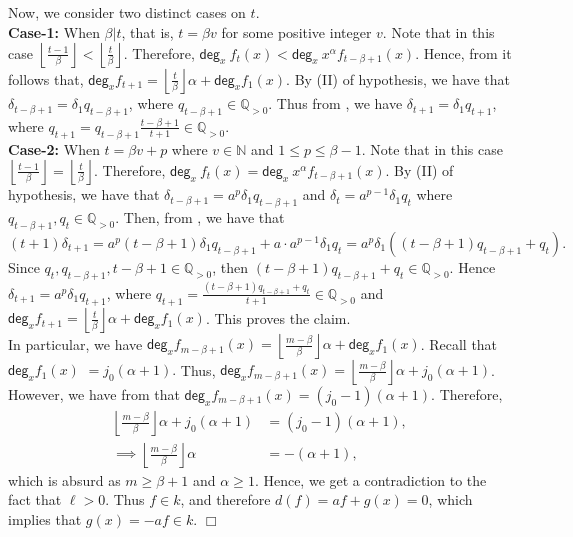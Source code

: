 \documentclass[12pt,reqno]{amsart}
\renewcommand{\deg}{\mathsf{deg}}
\renewcommand{\geq}{\geqslant}
\numberwithin{thm}{section}
\theoremstyle{definition}
\numberwithin{equation}{thm}
\renewenvironment{proof}{\par\noindent {\em Proof:}}{\hfill$\Box$\medskip}
\theoremstyle{plain}
\begin{document}
\begin{proof}
    Now, we consider two distinct cases on $t$.\\
    \noindent \textbf{Case-1:} When $\beta 
    |t$, that is, $t=\beta v$ for some positive integer $v$. Note that in this case $\left\lfloor \frac{t-1}{\beta}\right\rfloor<\left\lfloor \frac{t}{\beta}\right\rfloor$. Therefore, $\deg_x \ f_t(x)< \deg_x \ x^\alpha f_{t-\beta+1}(x)$. Hence, from  it follows that, $\deg_x f_{t+1}=\left\lfloor \frac{t}{\beta}\right\rfloor\alpha +\deg_xf_1(x)$. By (II) of hypothesis, we have that $\delta_{t-\beta+1}=\delta_1 q_{t-\beta+1}$, where $q_{t-\beta+1}\in \mathbb{Q}_{>0}$. Thus from , we have $\delta_{t+1}=\delta_1 q_{t+1}$, where $q_{t+1}=q_{t-\beta+1}\frac{t-\beta+1}{t+1}\in \mathbb{Q}_{>0}$.\\
    \textbf{Case-2:} When $t=\beta v +p$ where $v\in \mathbb{N}$ and $1\le p \le \beta-1$. Note that in this case $\left\lfloor \frac{t-1}{\beta}\right\rfloor= \left\lfloor \frac{t}{\beta}\right\rfloor$. Therefore, $\deg_x \ f_t(x)= \deg_x \ x^\alpha f_{t-\beta+1}(x)$. By (II) of hypothesis, we have that $\delta_{t-\beta+1}=a^p \delta_1 q_{t-\beta+1}$ and $\delta_{t}=a^{p-1}\delta_1 q_t$ where $q_{t-\beta+1},q_t\in \mathbb{Q}_{>0}$. Then, from , we have that
    $$ (t+1)\delta_{t+1}=a^p (t-\beta+1)\delta_1 q_{t-\beta+1}+a\cdot a^{p-1}\delta_1 q_t=a^p\delta_1((t-\beta+1)q_{t-\beta+1}+q_t).$$
    Since $q_t, q_{t-\beta+1},t-\beta+1\in \mathbb{Q}_{>0}$, then $(t-\beta+1)q_{t-\beta+1}+q_t\in \mathbb{Q}_{>0}$. Hence $\delta_{t+1}=a^p \delta_1 q_{t+1}$, where $q_{t+1}=\frac{(t-\beta+1)q_{t-\beta+1}+q_t}{t+1}\in \mathbb{Q}_{>0}$ and $\deg_x f_{t+1}=\left\lfloor \frac{t}{\beta}\right\rfloor \alpha +\deg_x f_1(x)$. 
    This proves the claim.\\
    In particular, we have $\deg_x f_{m-\beta+1}(x)=\left\lfloor \frac{m-\beta}{\beta} \right\rfloor \alpha+\deg_x f_1(x)$. Recall that $\deg_x f_1(x)$ $= j_0(\alpha+1).$ Thus, $\deg_x f_{m-\beta+1}(x)=\left\lfloor \frac{m-\beta}{\beta} \right\rfloor \alpha+ j_0(\alpha+1)$. However, we have from  that $\deg_x f_{m-\beta+1}(x)=(j_0-1)(\alpha+1)$. Therefore, 
    \begin{align*}
        \left\lfloor \frac{m-\beta}{\beta} \right\rfloor \alpha+ j_0(\alpha+1)&=(j_0-1)(\alpha+1),\\
         \implies \left\lfloor\frac{m-\beta}{\beta}\right\rfloor\alpha&=-(\alpha+1),
    \end{align*}
    which is absurd as $m\ge \beta +1$ and $\alpha\geq 1$.
    Hence, we get a contradiction to the fact that $\ell>0$. Thus $f\in k$, and therefore $d(f)=af+g(x)=0$, which implies that $g(x)=-af\in k$.
\end{proof}
\end{document}
